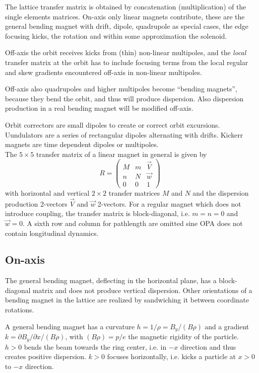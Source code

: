 \documentclass[12pt]{article}
\newcommand\beq{\begin{equation}}
\newcommand\eeq{\end{equation}}
\newcommand\pt{\partial}
\begin{document}
The lattice transfer matrix is obtained by concatenation (multiplication) of the single elements matrices. On-axis only linear magnets contribute, these are the general bending magnet with drift, dipole, quadrupole as special cases, the edge focusing kicks,  the rotation and within some approximation the solenoid.

Off-axis the orbit receives kicks from (thin) non-linear multipoles, and the {\em local} transfer matrix at the orbit has to include focusing terms from the local regular and skew gradients encountered off-axis in non-linear multipoles.

Off-axis also quadrupoles and higher multipoles become ``bending magnets'', because they bend the orbit, and thus will produce dispersion. Also dispersion production in a real bending magnet will be modified off-axis.

Orbit correctors are small dipoles to create or correct orbit excursions. Uundulators are a series of rectangular dipoles alternating with drifts. Kickerr magnets are time dependent dipoles or multipoles.\\

The $5\times 5$ transfer matrix of a linear magnet in general is given by
\beq
R = \left( \begin{array}{cc|c} M & m & \vec{V} \\ n & N & \vec{w} \\ 0 & 0 & 1 \end{array} \right)
\eeq
with horizontal and vertical $2\times 2$ transfer matrices $M$ and $N$ and the dispersion production 2-vectors $\vec{V}$ and $\vec{w}$ 2-vectors. 
For a regular magnet which does not introduce coupling, the transfer matrix is block-diagonal, i.e. $m=n=0$ and $\vec{w}=0$.
A sixth row and column for pathlength are omitted sine OPA does not contain longitudinal dynamics.\\

\subsection{On-axis}

The general bending magnet, deflecting in the horizontal plane, has a block-diagonal matrix and does not produce vertical dispersion. Other orientations of a bending magnet in the lattice are realized by sandwiching it between coordinate rotations.
\par
A general bending magnet has a curvature $h=1/\rho=B_y/(B\rho)$ and a gradient
$k=\pt B_y/\pt x/(B\rho)$, with $(B\rho)=p/e$ the magnetic rigidity of the particle.
$h>0$ bends the beam towards the ring center, i.e. in $-x$ direction and thus creates positive dispersion. $k>0$ focuses horizontally, i.e. kicks a particle at $x>0$ to $-x$ direction.
\end{document}
